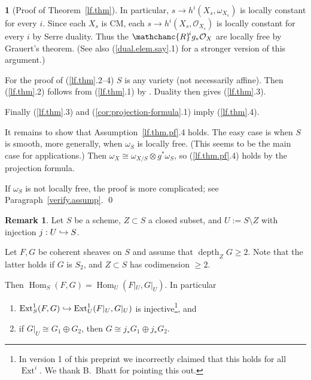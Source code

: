 \documentclass{amsart}
\theoremstyle{definition}
\newtheorem{say}[thm]{}
\newtheorem{rem}[thm]{Remark}
\theoremstyle{remark}
\renewcommand{\o}[0]{{\mathcal O}}
\newcommand{\ext}[0]{\operatorname{Ext}}
\newcommand{\Hom}[0]{\operatorname{Hom}}
\newcommand{\depth}[0]{\operatorname{depth}}
\def\into{\DOTSB\lhook\joinrel\to}
\newcommand{\myR}{{\mathchanc{R}\!}}
\begin{document}
\begin{say}[Proof of Theorem~\ref{lf.thm}]
In particular,  $s\to h^i(X_s, \omega_{X_s})$ is locally constant for every $i$. Since each $X_s$ is CM, each 
$s\to h^i(X_s, \o_{X_s})$ is locally constant for every $i$ by Serre duality. Thus the $\myR^ig_*\o_{X}$ are locally free by Grauert's theorem.
(See also  (\ref{dual.elem.say}.1) for a stronger version of this argument.)

For the proof of (\ref{lf.thm}.2--4) $S$ is any variety (not necessarily affine). 
Then   (\ref{lf.thm}.2) follows from  (\ref{lf.thm}.1)
by \cite[3.12]{k-hdi2}. Duality then  gives (\ref{lf.thm}.3).




 Finally (\ref{lf.thm}.3) and (\ref{cor:projection-formula}.1)  imply (\ref{lf.thm}.4).


 It remains to show that Assumption~\ref{lf.thm.pf}.4 holds.
 The easy case is when  $S$ is smooth, more generally, when
 $\omega_S$ is locally free.  (This seems to be the main case for applications.)
 Then  $\omega_X\cong\omega_{X/S}\otimes g^*\omega_S$, so 
 (\ref{lf.thm.pf}.4) holds by the  projection formula.  

If $\omega_S$ is not locally free, the proof is more complicated; see Paragraph~\ref{verify.assump}. 
  \qed
  \end{say}


  
  \begin{rem} \label{split.lem}
    Let $S$ be a scheme, $Z\subset S$ a closed subset,  and
    $U:=S\setminus Z$ with injection $j:U\into S$.

    Let $F,G$ be coherent sheaves on $S$ and assume that $\depth_ZG\geq 2$. Note that the latter holds if $G$ is $S_2$, and $Z\subset S$ has codimension $\geq 2$. 


    Then
    $\Hom_S(F, G)=\Hom_U(F|_U, G|_U)$. In particular
    \begin{enumerate}
    \item  $\ext^1_S(F, G)\into\ext^1_U(F|_U, G|_U)$ is injective\footnote{In version 1 of this preprint we incorrectly claimed that this holds for all $\ext^i$. We thank B.~Bhatt for pointing  this out.}, and
    \item if $G|_U\cong G_1\oplus G_2$, then
      $G\cong j_*G_1\oplus j_*G_2$.
    \end{enumerate}
    \end{rem}

    

    
   
\end{document}

